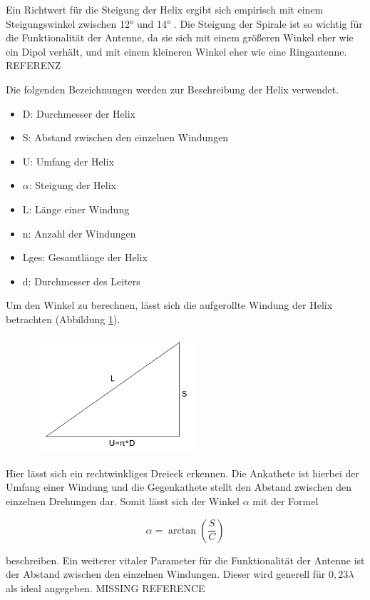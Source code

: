 Ein Richtwert für die Steigung der Helix ergibt sich empirisch mit einem Steigungswinkel zwischen 12° und 14° \cite{helixWebsite}. Die Steigung der Spirale ist so wichtig für die Funktionalität der Antenne, da sie sich mit einem größeren Winkel eher wie ein Dipol verhält, und mit einem kleineren Winkel eher wie eine Ringantenne. REFERENZ

Die folgenden Bezeichnungen werden zur Beschreibung der Helix verwendet.
\begin{itemize}
	\item D: Durchmesser der Helix
	\item S: Abstand zwischen den einzelnen Windungen
	\item U: Umfang der Helix
	\item $\alpha$: Steigung der Helix
	\item L: Länge einer Windung
	\item n: Anzahl der Windungen
	\item Lges: Gesamtlänge der Helix
	\item d: Durchmesser des Leiters
\end{itemize}

Um den Winkel zu berechnen, lässt sich die aufgerollte Windung der Helix betrachten (Abbildung \ref{fig:Wndg_aufgerollt}).

\begin{figure}[H]
	\centering
	\includegraphics[width=6cm]{../ref/Windung_aufgerollt.png}
	\label{fig:Wndg_aufgerollt}
\end{figure}

Hier lässt sich ein rechtwinkliges Dreieck erkennen. Die Ankathete ist hierbei der Umfang einer Windung und die Gegenkathete stellt den Abstand zwischen den einzelnen Drehungen dar. Somit lässt sich der Winkel $\alpha$ mit der Formel

\begin{equation}
	\alpha=\arctan(\frac{S}{C})
\end{equation}

beschreiben. Ein weiterer vitaler Parameter für die Funktionalität der Antenne ist der Abstand zwischen den einzelnen Windungen. Dieser wird generell für $0,23\lambda$ als ideal angegeben. MISSING REFERENCE

